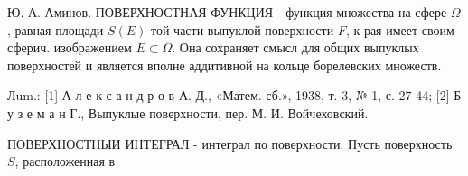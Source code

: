 \documentclass[10pt]{article}
\begin{document}
Ю. А. Аминов. ПОВЕРХНОСТНАЯ ФУНКЦИЯ - функция множества на сфере $\Omega$, равная площади $S(E)$ той части выпуклой поверхности $F$, к-рая имеет своим сферич. изображением $E \subset \Omega$. Она сохраняет смысл для общих выпуклых поверхностей и является вполне аддитивной на кольце борелевских множеств.



Лum.: [1] А л е к с а н д р о в А. Д., «Матем. сб.», 1938, т. 3, № 1, с. 27-44; [2] Б у з е м а н Г., Выпуклые поверхности, пер. М. И. Войчеховский.



ПОВЕРХНОСТНЫИ ИНТЕГРАЛ - интеграл по поверхности. Пусть поверхность $S$, расположенная в
\end{document}
